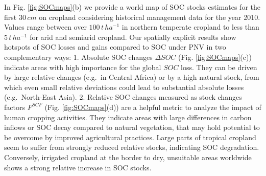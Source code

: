 \documentclass[gc, manuscript]{copernicus}
\begin{document}
In Fig. \ref{fig:SOCmaps}(b) we provide a world map of SOC stocks estimates for the first \(30\,\unit{cm}\) on cropland considering historical management data for the year 2010. Values range between over \(100\,\unit{t\,ha^{-1}}\) in northern temperate cropland to less than \(5\,\unit{t\,ha^{-1}}\) for arid and semiarid cropland.
Our spatially explicit results show hotspots of SOC losses and gains compared to SOC under PNV in two complementary ways:
1. Absolute SOC changes \(\Delta SOC\) (Fig. \ref{fig:SOCmaps}(c)) indicate areas with high importance for the global \(SOC\) loss. They can be driven by large relative changes (e.g.~in Central Africa) or by a high natural stock, from which even small relative deviations could lead to substantial absolute losses (e.g.~North-East Asia).
2. Relative SOC changes measured as stock changes factors \(F^{SCF}\) (Fig. \ref{fig:SOCmaps}(d)) are a helpful metric to analyze the impact of human cropping activities. They indicate areas with large differences in carbon inflows or SOC decay compared to natural vegetation, that may hold potential to be overcome by improved agricultural practices. Large parts of tropical cropland seem to suffer from strongly reduced relative stocks, indicating SOC degradation. Conversely, irrigated cropland at the border to dry, unsuitable areas worldwide shows a strong relative increase in SOC stocks.
\end{document}

